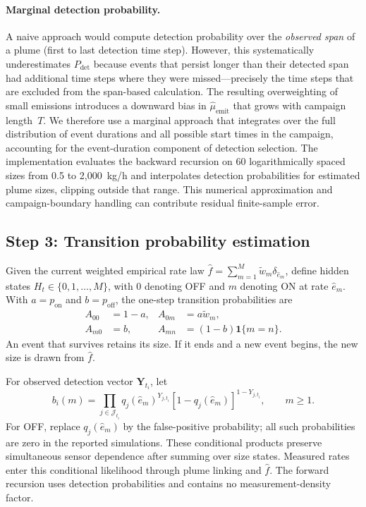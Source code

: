 \documentclass[11pt]{article}
\newcommand{\ind}{\mathbf{1}}
\begin{document}
\paragraph{Marginal detection probability.}
A naive approach would compute detection probability over the \emph{observed span} of a plume (first to last detection time step). However, this systematically underestimates $P_{\text{det}}$ because events that persist longer than their detected span had additional time steps where they were missed---precisely the time steps that are excluded from the span-based calculation. The resulting overweighting of small emissions introduces a downward bias in $\hat{\mu}_{\text{emit}}$ that grows with campaign length~$T$. We therefore use a marginal approach that integrates over the full distribution of event durations and all possible start times in the campaign, accounting for the event-duration component of detection selection. The implementation evaluates the backward recursion on 60 logarithmically spaced sizes from 0.5 to 2,000~kg/h and interpolates detection probabilities for estimated plume sizes, clipping outside that range. This numerical approximation and campaign-boundary handling can contribute residual finite-sample error.

\subsection{Step 3: Transition probability estimation}
\label{sec:forward}

Given the current weighted empirical rate law $\hat f=\sum_{m=1}^M\tilde w_m\delta_{\hat e_m}$, define hidden states $H_t\in\{0,1,\ldots,M\}$, with $0$ denoting OFF and $m$ denoting ON at rate $\hat e_m$. With $a=p_{\text{on}}$ and $b=p_{\text{off}}$, the one-step transition probabilities are
\begin{align}
 A_{00}&=1-a,& A_{0m}&=a\tilde w_m,\\
 A_{m0}&=b,& A_{mn}&=(1-b)\ind\{m=n\}.
\end{align}
An event that survives retains its size. If it ends and a new event begins, the new size is drawn from $\hat f$.

For observed detection vector $\mathbf Y_{t_i}$, let
\begin{equation}
 b_i(m)=\prod_{j\in\mathcal J_{t_i}}q_j(\hat e_m)^{Y_{j,t_i}}
                  [1-q_j(\hat e_m)]^{1-Y_{j,t_i}},\qquad m\ge1.
\end{equation}
For OFF, replace $q_j(\hat e_m)$ by the false-positive probability; all such probabilities are zero in the reported simulations. These conditional products preserve simultaneous sensor dependence after summing over size states. Measured rates enter this conditional likelihood through plume linking and $\hat f$. The forward recursion uses detection probabilities and contains no measurement-density factor.
\end{document}
